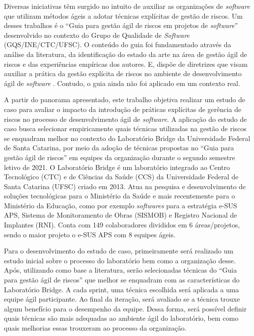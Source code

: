 \documentclass[
    12pt,       %
    openright,      %
    twoside,      %
    a4paper,      %
    english,      %
    french,       %
    spanish,      %
    brazil,       %
    ]{abntex2}
\begin{document}
Diversas iniciativas têm surgido no intuito de auxiliar as organizações de \textit{software} que utilizam métodos ágeis a adotar técnicas explícitas de gestão de riscos. Um desses trabalhos é o “Guia para gestão ágil de riscos em projetos de \textit{software}” desenvolvido no contexto do Grupo de Qualidade de \textit{Software} (GQS/INE/CTC/UFSC). O conteúdo do guia foi fundamentado através da análise da literatura, da identificação do estado da arte na área de gestão ágil de riscos e das experiências empíricas dos autores. E, dispõe de diretrizes que visam auxiliar a prática da gestão explícita de riscos no ambiente de desenvolvimento ágil de \textit{software} \cite{Vieira:2020}. Contudo, o guia ainda não foi aplicado em um contexto real.

A partir do panorama apresentado, este trabalho objetiva realizar um estudo de caso para avaliar o impacto da introdução de práticas explícitas de gerência de riscos no processo de desenvolvimento ágil de \textit{software}. A aplicação do estudo de caso busca selecionar empiricamente quais técnicas utilizadas na gestão de riscos se enquadram melhor no contexto do Laboratório Bridge da Universidade Federal de Santa Catarina, por meio da adoção de técnicas propostas no “Guia para gestão ágil de riscos” \cite{Vieira:2020} em equipes da organização durante o segundo semestre letivo de 2021. O Laboratório Bridge é um laboratório integrado ao Centro Tecnológico (CTC) e de Ciências da Saúde (CCS) da Universidade Federal de Santa Catarina (UFSC) criado em 2013. Atua na pesquisa e desenvolvimento de soluções tecnológicas para o Ministério da Saúde e mais recentemente para o Ministério da Educação, como por exemplo \textit{softwares} para a estratégia e-SUS APS, Sistema de Monitoramento de Obras (SISMOB) e Registro Nacional de Implantes (RNI). Conta com 149 colaboradores divididos em 6 áreas/projetos, sendo o maior projeto o e-SUS APS com 8 equipes ágeis.

Para o desenvolvimento do estudo de caso, primeiramente será realizado um estudo inicial sobre o processo do laboratório bem como a organização desse. Após, utilizando como base a literatura, serão selecionadas técnicas do “Guia para gestão ágil de riscos” \cite{Vieira:2020} que melhor se enquadram com as características do Laboratório Bridge. A cada sprint, uma técnica escolhida será aplicada a uma equipe ágil participante. Ao final da iteração, será avaliado se a técnica trouxe algum benefício para o desempenho da equipe. Dessa forma, será possível definir quais técnicas são mais adequadas ao ambiente ágil do laboratório, bem como quais melhorias essas trouxeram ao processo da organização.
\end{document}
